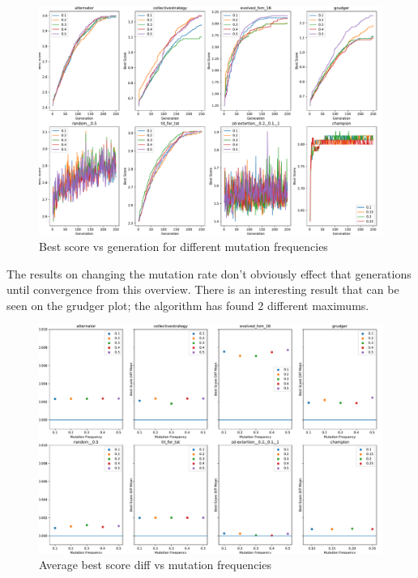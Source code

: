 \begin{figure}[ht]
    \includegraphics[width=1.0\textwidth, center]{./img/plots/MUT_FREQ_bs_v_gen_all.pdf}
    \caption{Best score vs generation for different mutation frequencies}\label{fig:MUT-FREQ-bs-v-gen-all}
\end{figure}

The results on changing the mutation rate don't obviously effect that generations until convergence from this overview.
There is an interesting result that can be seen on the grudger plot;
the algorithm has found 2 different maximums.

\begin{figure}[ht]
    \includegraphics[width=1.0\textwidth, center]{./img/plots/MUT_FREQ_bs_diff_v_freq_all.pdf}
    \caption{Average best score diff vs mutation frequencies}\label{fig:MUT-FREQ-bs-diff-v-freq-all}
\end{figure}

